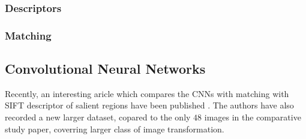 \subsubsection{Descriptors}

\subsubsection{Matching}

\subsection{Convolutional Neural Networks}

Recently, an interesting aricle which compares the CNNs with matching with SIFT descriptor of salient regions have been published \cite{FischerDB14}. The authors have also recorded a new larger dataset, copared to the only $48$ images in the comparative study paper, coverring larger class of image transformation. 